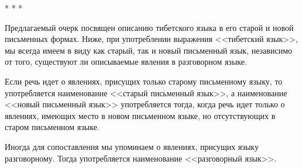 \begin{center}
* * *
\end{center}

Предлагаемый очерк посвящен описанию тибетского языка в его старой и новой письменных формах. Ниже, при употреблении выражения <<тибетский язык>>, мы всегда имеем в виду как старый, так и новый письменный язык, независимо от того, существуют ли описываемые явления в разговорном языке.

Если речь идет о явлениях, присущих только старому письменному языку, то употребляется наименование <<старый письменный язык>>, а наименование <<новый письменный язык>> употребляется тогда, когда речь идет только о явлениях, имеющих место в новом письменном языке, но отсутствующих в старом письменном языке.

Иногда для сопоставления мы упоминаем о явлениях, присущих языку разговорному. Тогда употребляется наименование <<разговорный язык>>.

